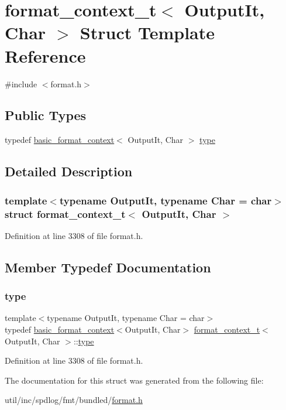 \hypertarget{structformat__context__t}{}\section{format\+\_\+context\+\_\+t$<$ Output\+It, Char $>$ Struct Template Reference}
\label{structformat__context__t}


{\ttfamily \#include $<$format.\+h$>$}

\subsection*{Public Types}
\begin{DoxyCompactItemize}
\item 
typedef \hyperlink{classbasic__format__context}{basic\+\_\+format\+\_\+context}$<$ Output\+It, Char $>$ \hyperlink{structformat__context__t_ae03422332865c5e9ecabb6f71684a6bc}{type}
\end{DoxyCompactItemize}


\subsection{Detailed Description}
\subsubsection*{template$<$typename Output\+It, typename Char = char$>$\newline
struct format\+\_\+context\+\_\+t$<$ Output\+It, Char $>$}



Definition at line 3308 of file format.\+h.



\subsection{Member Typedef Documentation}
\mbox{\label{structformat__context__t_ae03422332865c5e9ecabb6f71684a6bc}} 
\subsubsection{\texorpdfstring{type}{type}}
{\footnotesize\ttfamily template$<$typename Output\+It, typename Char = char$>$ \\
typedef \hyperlink{classbasic__format__context}{basic\+\_\+format\+\_\+context}$<$Output\+It, Char$>$ \hyperlink{structformat__context__t}{format\+\_\+context\+\_\+t}$<$ Output\+It, Char $>$\+::\hyperlink{structformat__context__t_ae03422332865c5e9ecabb6f71684a6bc}{type}}



Definition at line 3308 of file format.\+h.



The documentation for this struct was generated from the following file\+:\begin{DoxyCompactItemize}
\item 
util/inc/spdlog/fmt/bundled/\hyperlink{format_8h}{format.\+h}\end{DoxyCompactItemize}
